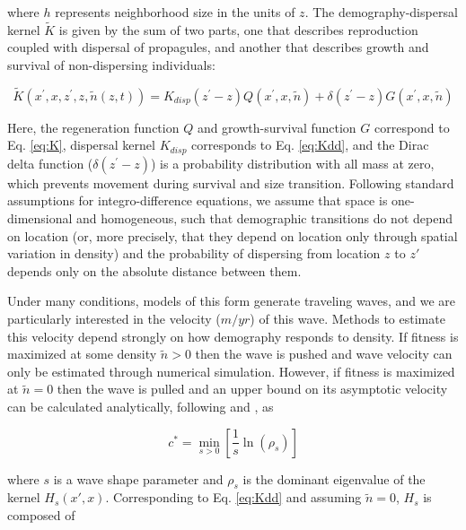 \documentclass[11pt]{article}\usepackage[]{graphicx}\usepackage[usenames,dvipsnames]{xcolor}
\begin{document}
where $h$ represents neighborhood size in the units of $z$.
The demography-dispersal kernel $\tilde{K}$ is given by the sum of two parts, one that describes reproduction coupled with dispersal of propagules, and another that describes growth and survival of non-dispersing individuals:

\begin{linenomath*} 
\begin{equation} \label{eq:Kdd}
\tilde{K}(x^\prime,x,z^\prime,z,\tilde{n}(z,t)) = K_{disp}(z^\prime-z)Q(x^\prime,x,\tilde{n}) + \delta(z^\prime-z)G(x^\prime,x,\tilde{n})
\end{equation} 
\end{linenomath*}

Here, the regeneration function $Q$ and growth-survival function $G$ correspond to Eq. \ref{eq:K}, dispersal kernel $K_{disp}$ corresponds to Eq. \ref{eq:Kdd}, and the Dirac delta function ($\delta(z^\prime-z)$) is a probability distribution with all mass at zero, which prevents movement during survival and size transition. 
Following standard assumptions for integro-difference equations, we assume that space is one-dimensional and homogeneous, such that demographic transitions do not depend on location (or, more precisely, that they depend on location only through spatial variation in density) and the probability of dispersing from location $z$ to $z\prime$ depends only on the absolute distance between them.

Under many conditions, models of this form generate traveling waves, and we are particularly interested in the velocity ($m/yr$) of this wave.
Methods to estimate this velocity depend strongly on how demography responds to density. 
If fitness is maximized at some density $\tilde{n}>0$ then the wave is pushed and wave velocity can only be estimated through numerical simulation. 
However, if fitness is maximized at $\tilde{n}=0$ then the wave is pulled and an upper bound on its asymptotic velocity can be calculated analytically, following \cite{neubert2000demography} and \cite{jongejans2011importance}, as

\begin{linenomath*} 
\begin{equation} 
c^* = \min_{s > 0} \left[\frac{1}{s}\ln(\rho_{s})\right] 
\end{equation} 
\end{linenomath*} 

where $s$ is a wave shape parameter and $\rho_{s}$ is the dominant eigenvalue of the kernel $H_{s}(x\prime,x)$.
Corresponding to Eq. \ref{eq:Kdd} and assuming $\tilde{n}=0$, $H_{s}$ is composed of
\end{document}
